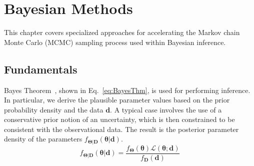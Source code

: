 \chapter{Bayesian Methods}\label{uq:bayes}


This chapter covers specialized approaches for accelerating the Markov
chain Monte Carlo (MCMC) sampling process used within Bayesian inference.

\section{Fundamentals} \label{uq:bayes:basic}

Bayes Theorem~\cite{Jaynes}, shown in Eq.~\ref{eq:BayesThm}, is used
for performing inference.  In particular, we derive the plausible
parameter values based on the prior probability density and the data
$\boldsymbol{d}$. A typical case involves the use of a conservative prior notion of
an uncertainty, which is then constrained to be consistent with the
observational data.  The result is the posterior parameter density of
the parameters $f_{\boldsymbol{\Theta |D}}\left( \boldsymbol{\theta |d} \right)$.
\begin{equation}
{f_{\boldsymbol{\Theta |D}}}\left( \boldsymbol{\theta |d} \right) = \frac{{{f_{\boldsymbol{\Theta}}}\left( \boldsymbol{\theta}  \right)\mathcal{L}\left( \boldsymbol{\theta;d} \right)}}{{{f_{\boldsymbol{D}}}\left( \boldsymbol{d} \right)}} \label{eq:BayesThm}
\end{equation}


